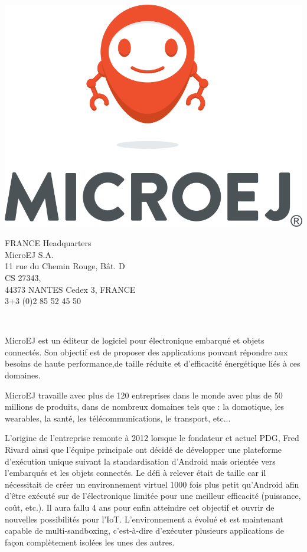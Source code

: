 \documentclass[french,a4paper,12pt]{report}
\begin{document}
\noindent
\begin{minipage}[c]{0.5\textwidth}
\centering
\includegraphics[width=0.8\linewidth]{ressources/logos/vertical_mascot_huge.png}
\end{minipage}
\noindent
\begin{minipage}[c]{0.49\textwidth}\raggedright
 FRANCE Headquarters\\
 MicroEJ S.A.\\
 11 rue du Chemin Rouge, Bât. D\\
 CS 27343,\\
 44373 NANTES Cedex 3, FRANCE\\
 3+3 (0)2 85 52 45 50\\
\end{minipage}\\

\bigskip

MicroEJ est un éditeur de logiciel pour électronique embarqué et objets connectés. Son objectif est de proposer des applications pouvant répondre aux besoins de haute performance,de taille réduite et d'efficacité énergétique liés à ces domaines.

MicroEJ travaille avec plus de 120 entreprises dans le monde avec plus de 50 millions de produits, dans de nombreux domaines tels que : la domotique, les wearables, la santé, les télécommunications, le transport, etc...

L’origine de l’entreprise remonte à 2012 lorsque le fondateur et actuel PDG, Fred Rivard ainsi que l’équipe principale ont décidé de développer une plateforme d’exécution unique suivant la standardisation d’Android mais orientée vers l'embarqués et les objets connectés. Le défi à relever était de taille car il nécessitait de créer un environnement virtuel 1000 fois plus petit qu’Android afin d’être exécuté sur de l’électronique limitée pour une meilleur efficacité (puissance, coût, etc.). Il aura fallu 4 ans pour enfin atteindre cet objectif et ouvrir de nouvelles possibilités pour l’IoT. 
L'environnement a évolué et est maintenant capable de multi-sandboxing, c'est-à-dire d’exécuter plusieurs applications de façon complètement isolées les unes des autres.
\end{document}
